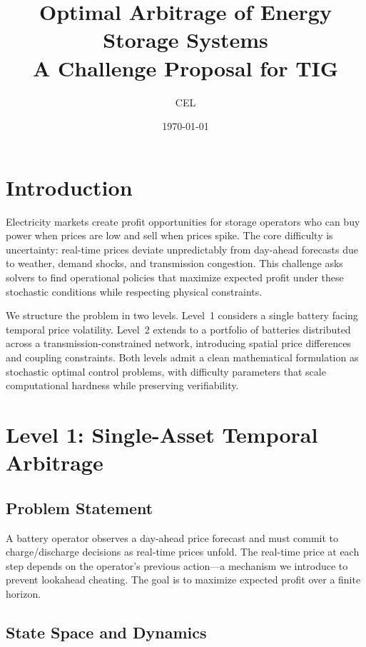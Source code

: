 \documentclass[11pt]{article}
\title{\textbf{Optimal Arbitrage of Energy Storage Systems}\\[0.3em]\large A Challenge Proposal for TIG}
\author{CEL}
\date{\today}
\begin{document}
\maketitle

\section{Introduction}

Electricity markets create profit opportunities for storage operators who can buy power when prices are low and sell when prices spike. The core difficulty is uncertainty: real-time prices deviate unpredictably from day-ahead forecasts due to weather, demand shocks, and transmission congestion. This challenge asks solvers to find operational policies that maximize expected profit under these stochastic conditions while respecting physical constraints.

We structure the problem in two levels. Level~1 considers a single battery facing temporal price volatility. Level~2 extends to a portfolio of batteries distributed across a transmission-constrained network, introducing spatial price differences and coupling constraints. Both levels admit a clean mathematical formulation as stochastic optimal control problems, with difficulty parameters that scale computational hardness while preserving verifiability.

\section{Level 1: Single-Asset Temporal Arbitrage}

\subsection{Problem Statement}

A battery operator observes a day-ahead price forecast and must commit to charge/discharge decisions as real-time prices unfold. The real-time price at each step depends on the operator's previous action---a mechanism we introduce to prevent lookahead cheating. The goal is to maximize expected profit over a finite horizon.

\subsection{State Space and Dynamics}
\end{document}
